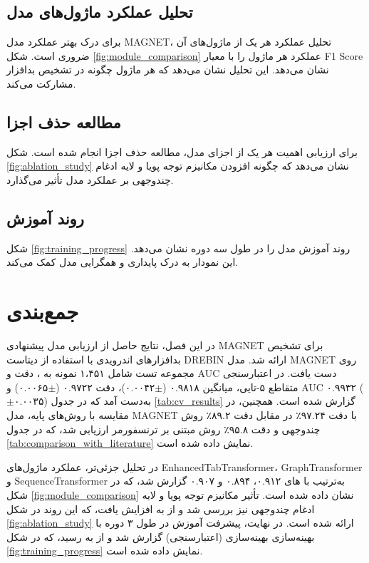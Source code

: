 \subsection{تحلیل عملکرد ماژول‌های مدل}
برای درک بهتر عملکرد مدل MAGNET، تحلیل عملکرد هر یک از ماژول‌های آن ضروری است. شکل \ref{fig:module_comparison} عملکرد هر ماژول را با معیار F1 Score نشان می‌دهد. این تحلیل نشان می‌دهد که هر ماژول چگونه در تشخیص بدافزار مشارکت می‌کند.

\subsection{مطالعه حذف اجزا}
برای ارزیابی اهمیت هر یک از اجزای مدل، مطالعه حذف اجزا انجام شده است. شکل \ref{fig:ablation_study} نشان می‌دهد که چگونه افزودن مکانیزم توجه پویا و لایه ادغام چندوجهی بر عملکرد مدل تأثیر می‌گذارد.

\subsection{روند آموزش}
شکل \ref{fig:training_progress} روند آموزش مدل را در طول سه دوره نشان می‌دهد. این نمودار به درک پایداری و همگرایی مدل کمک می‌کند.

\section{جمع‌بندی}
در این فصل، نتایج حاصل از ارزیابی مدل پیشنهادی MAGNET برای تشخیص بدافزارهای اندرویدی با استفاده از دیتاست DREBIN \cite{Drebin} ارائه شد. مدل MAGNET روی مجموعه تست شامل ۱،۴۵۱ نمونه به  ، دقت  و AUC  دست یافت. در اعتبارسنجی متقاطع ۵-تایی، میانگین  ۰.۹۸۱۸ ($\pm$۰.۰۰۴۲)، دقت ۰.۹۷۲۲ ($\pm$۰.۰۰۶۵) و AUC ۰.۹۹۳۲ ($\pm$۰.۰۰۳۵) به‌دست آمد که در جدول \ref{tab:cv_results} گزارش شده است. همچنین، در مقایسه با روش‌های پایه، مدل MAGNET با دقت ۹۷.۲۴٪ در مقابل دقت ۸۹.۲٪ روش چندوجهی \cite{Alsaleh2023} و دقت ۹۵.۸٪ روش مبتنی بر ترنسفورمر \cite{TransformerMalware} ارزیابی شد، که در جدول \ref{tab:comparison_with_literature} نمایش داده شده است.

در تحلیل جزئی‌تر، عملکرد ماژول‌های EnhancedTabTransformer، GraphTransformer و SequenceTransformer به‌ترتیب با های ۰.۹۱۲، ۰.۸۹۴ و ۰.۹۰۷ گزارش شد، که در شکل \ref{fig:module_comparison} نشان داده شده است. تأثیر مکانیزم توجه پویا و لایه ادغام چندوجهی نیز بررسی شد و  از  به  افزایش یافت، که این روند در شکل \ref{fig:ablation_study} ارائه شده است. در نهایت، پیشرفت آموزش در طول ۳ دوره با بهینه‌سازی بهینه‌سازی (اعتبارسنجی) گزارش شد و  از  به  رسید، که در شکل \ref{fig:training_progress} نمایش داده شده است.

